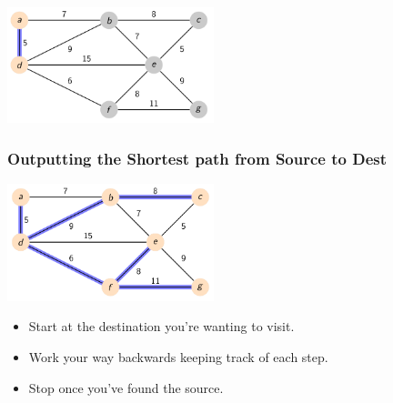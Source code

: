 \documentclass{beamer}
\begin{document}
\begin{frame}[fragile]
    \centering

    \includegraphics[width=0.45\textwidth]{./imgs/dijkstra_walkthrough/dijkstra-2.png}

\end{frame}

\begin{frame}[fragile]
    \frametitle{Outputting the Shortest path from Source to Dest}
    \centering
    \includegraphics[width=0.45\textwidth]{./imgs/dijkstra_walkthrough/dijkstra-8.png}
    \begin{itemize}
        \item Start at the destination you're wanting to visit.
        \item Work your way backwards keeping track of each step.
        \item Stop once you've found the source.
    \end{itemize}
\end{frame}
\end{document}
